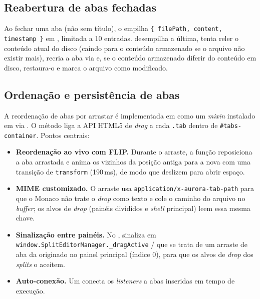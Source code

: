 \subsection{Reabertura de abas fechadas}
\label{sec:editor-reopen}

Ao fechar uma aba (não sem título), o  empilha
\lstinline|{ filePath, content, timestamp }| em ,
limitada a 10 entradas.  desempilha a última, tenta
reler o conteúdo atual do disco (caindo para o conteúdo armazenado se o arquivo
não existir mais), recria a aba via  e, se o conteúdo armazenado
diferir do conteúdo em disco, restaura-o e marca o arquivo como modificado.

\subsection{Ordenação e persistência de abas}
\label{sec:editor-order}

A reordenação de abas por arrastar é implementada em 
como um \emph{mixin} instalado em  via . O
método  liga a API HTML5 de \emph{drag} a cada
\lstinline|.tab| dentro de \lstinline|#tabs-container|. Pontos centrais:

\begin{itemize}[leftmargin=*]
  \item \textbf{Reordenação ao vivo com FLIP.} Durante o arraste, a função
         reposiciona a aba arrastada e anima os vizinhos da
        posição antiga para a nova com uma transição de \lstinline|transform|
        (190\,ms), de modo que deslizem para abrir espaço.
  \item \textbf{MIME customizado.} O arraste usa
        \lstinline|application/x-aurora-tab-path| para que o Monaco não trate o
        \emph{drop} como texto e cole o caminho do arquivo no \emph{buffer}; os
        alvos de \emph{drop} (painéis divididos e \emph{shell} principal) leem
        essa mesma chave.
  \item \textbf{Sinalização entre painéis.} No , sinaliza em
        \lstinline|window.SplitEditorManager._dragActive| / 
        que se trata de um arraste de aba da  originado no painel
        principal (índice 0), para que os alvos de \emph{drop} dos \emph{splits}
        o aceitem.
  \item \textbf{Auto-conexão.} Um  conecta os
        \emph{listeners} a abas inseridas em tempo de execução.
\end{itemize}

